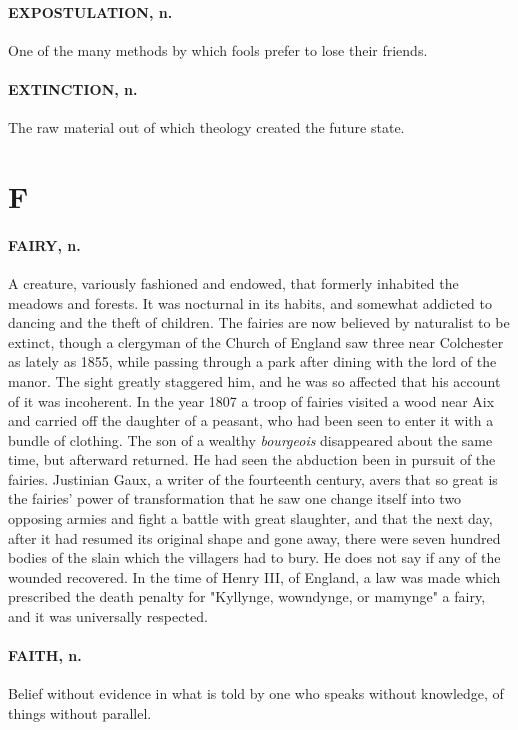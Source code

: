 \documentclass[11pt]{article}
\begin{document}
\paragraph{EXPOSTULATION, n.}  One of the many methods by which fools prefer to
lose their friends.

\paragraph{EXTINCTION, n.}  The raw material out of which theology created the
future state.



\section*{F}



\paragraph{FAIRY, n.}  A creature, variously fashioned and endowed, that formerly
inhabited the meadows and forests.  It was nocturnal in its habits,
and somewhat addicted to dancing and the theft of children.  The
fairies are now believed by naturalist to be extinct, though a
clergyman of the Church of England saw three near Colchester as lately
as 1855, while passing through a park after dining with the lord of
the manor.  The sight greatly staggered him, and he was so affected
that his account of it was incoherent.  In the year 1807 a troop of
fairies visited a wood near Aix and carried off the daughter of a
peasant, who had been seen to enter it with a bundle of clothing.  The
son of a wealthy {\em bourgeois} disappeared about the same time, but
afterward returned.  He had seen the abduction been in pursuit of the
fairies.  Justinian Gaux, a writer of the fourteenth century, avers
that so great is the fairies' power of transformation that he saw one
change itself into two opposing armies and fight a battle with great
slaughter, and that the next day, after it had resumed its original
shape and gone away, there were seven hundred bodies of the slain
which the villagers had to bury.  He does not say if any of the
wounded recovered.  In the time of Henry III, of England, a law was
made which prescribed the death penalty for "Kyllynge, wowndynge, or
mamynge" a fairy, and it was universally respected.

\paragraph{FAITH, n.}  Belief without evidence in what is told by one who speaks
without knowledge, of things without parallel.
\end{document}
